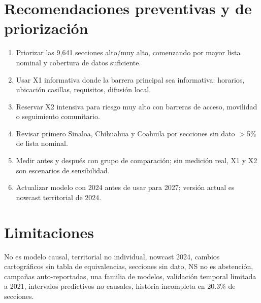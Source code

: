 \documentclass[12pt,a4paper]{article}
\begin{document}
\section{Recomendaciones preventivas y de priorización}
\begin{enumerate}
\item Priorizar las 9,641 secciones alto/muy alto, comenzando por mayor lista nominal y cobertura de datos suficiente.
\item Usar X1 informativa donde la barrera principal sea informativa: horarios, ubicación casillas, requisitos, difusión local.
\item Reservar X2 intensiva para riesgo muy alto con barreras de acceso, movilidad o seguimiento comunitario.
\item Revisar primero Sinaloa, Chihuahua y Coahuila por secciones sin dato $>$5\% de lista nominal.
\item Medir antes y después con grupo de comparación; sin medición real, X1 y X2 son escenarios de sensibilidad.
\item Actualizar modelo con 2024 antes de usar para 2027; versión actual es nowcast territorial de 2024.
\end{enumerate}

\section{Limitaciones}
No es modelo causal, territorial no individual, nowcast 2024, cambios cartográficos sin tabla de equivalencias, secciones sin dato, NS no es abstención, campañas auto-reportadas, una familia de modelos, validación temporal limitada a 2021, intervalos predictivos no causales, historia incompleta en 20.3\% de secciones.
\end{document}
